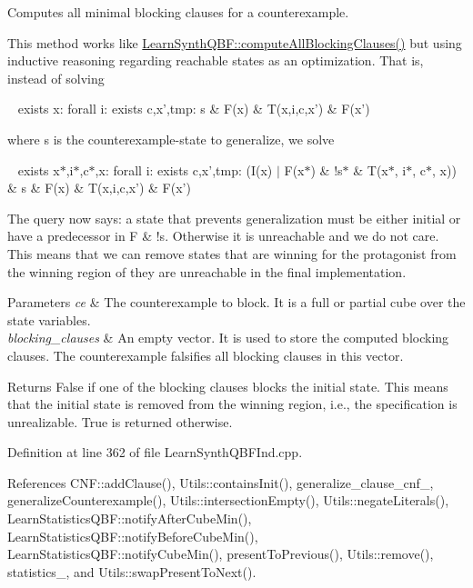 Computes all minimal blocking clauses for a counterexample. 

This method works like \hyperlink{classLearnSynthQBF_affa7b4583cc17d01f4c82fd57e763e1f}{Learn\-Synth\-Q\-B\-F\-::compute\-All\-Blocking\-Clauses()} but using inductive reasoning regarding reachable states as an optimization. That is, instead of solving \par
 ~ exists x\-: forall i\-: exists c,x',tmp\-: s \& F(x) \& T(x,i,c,x') \& F(x') \par
 where s is the counterexample-\/state to generalize, we solve \par
 ~ exists x$\ast$,i$\ast$,c$\ast$,x\-: forall i\-: exists c,x',tmp\-: (I(x) $|$ F(x$\ast$) \& !s$\ast$ \& T(x$\ast$, i$\ast$, c$\ast$, x)) \& s \& F(x) \& T(x,i,c,x') \& F(x') \par
 The query now says\-: a state that prevents generalization must be either initial or have a predecessor in F \& !s. Otherwise it is unreachable and we do not care. This means that we can remove states that are winning for the protagonist from the winning region of they are unreachable in the final implementation.


\begin{DoxyParams}{Parameters}
{\em ce} & The counterexample to block. It is a full or partial cube over the state variables. \\
\hline
{\em blocking\-\_\-clauses} & An empty vector. It is used to store the computed blocking clauses. The counterexample falsifies all blocking clauses in this vector. \\
\hline
\end{DoxyParams}
\begin{DoxyReturn}{Returns}
False if one of the blocking clauses blocks the initial state. This means that the initial state is removed from the winning region, i.\-e., the specification is unrealizable. True is returned otherwise. 
\end{DoxyReturn}


Definition at line 362 of file Learn\-Synth\-Q\-B\-F\-Ind.\-cpp.



References C\-N\-F\-::add\-Clause(), Utils\-::contains\-Init(), generalize\-\_\-clause\-\_\-cnf\-\_\-, generalize\-Counterexample(), Utils\-::intersection\-Empty(), Utils\-::negate\-Literals(), Learn\-Statistics\-Q\-B\-F\-::notify\-After\-Cube\-Min(), Learn\-Statistics\-Q\-B\-F\-::notify\-Before\-Cube\-Min(), Learn\-Statistics\-Q\-B\-F\-::notify\-Cube\-Min(), present\-To\-Previous(), Utils\-::remove(), statistics\-\_\-, and Utils\-::swap\-Present\-To\-Next().



